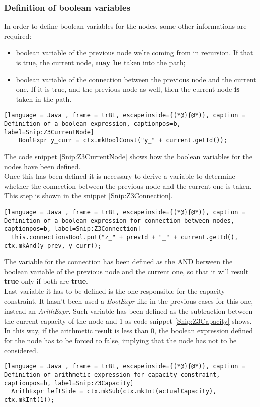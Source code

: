 \subsubsection{Definition of boolean variables}
In order to define boolean variables for the nodes, some other informations are required:
\begin{itemize}
  \item boolean variable of the previous node we're coming from in recursion. If that is true, the current node, \textbf{may be} taken into the path;
  \item boolean variable of the connection between the previous node and the current one. If it is true, and the previous node as well, then the current node \textbf{is} taken in the path.
\end{itemize}
\begin{lstlisting}[language = Java , frame = trBL, escapeinside={(*@}{@*)}, caption = Definition of a boolean expression, captionpos=b, label=Snip:Z3CurrentNode]
	BoolExpr y_curr = ctx.mkBoolConst("y_" + current.getId());
\end{lstlisting}
The code snippet \ref{Snip:Z3CurrentNode} shows how the boolean variables for the nodes have been defined.\\
Once this has been defined it is necessary to derive a variable to determine whether the connection between the previous node and the current one is taken. This step is shown in the snippet \ref{Snip:Z3Connection}.
\begin{lstlisting}[language = Java , frame = trBL, escapeinside={(*@}{@*)}, caption = Definition of a boolean expression for connection between nodes, captionpos=b, label=Snip:Z3Connection]
  this.connectionsBool.put("z_" + prevId + "_" + current.getId(), ctx.mkAnd(y_prev, y_curr));
\end{lstlisting}
The variable for the connection has been defined as the AND between the boolean variable of the previous node and the current one, so that it will result \textbf{true} only if both are \textbf{true}.\\
Last variable it has to be defined is the one responsible for the capacity constraint. It hasn't been used a \textit{BoolExpr} like in the previous cases for this one, instead an \textit{ArithExpr}. Such variable has been defined as the subtraction between the current capacity of the node and 1 as code snippet \ref{Snip:Z3Capacity} shows. In this way, if the arithmetic result is less than 0, the boolean expression defined for the node has to be forced to false, implying that the node has not to be considered.
\begin{lstlisting}[language = Java , frame = trBL, escapeinside={(*@}{@*)}, caption = Definition of arithmetic expression for capacity constraint, captionpos=b, label=Snip:Z3Capacity]
  ArithExpr leftSide = ctx.mkSub(ctx.mkInt(actualCapacity), ctx.mkInt(1));
\end{lstlisting}

